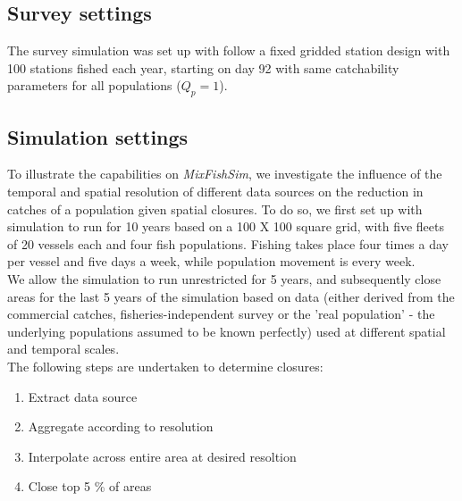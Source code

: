 \documentclass[review]{elsarticle}
\begin{document}
\subsection{Survey settings}

The survey simulation was set up with follow a fixed gridded station design
with 100 stations fished each year, starting on day 92  with same catchability parameters for
all populations ($Q_{p} = 1$). 

\subsection{Simulation settings}

To illustrate the capabilities on \emph{MixFishSim}, we investigate the
influence of the temporal and spatial resolution of different data sources on
the reduction in catches of a population given spatial closures. To do so, we
first set up with simulation to run for 10 years based on a 100 X 100 square
grid, with five fleets of 20 vessels each and four fish populations. Fishing
takes place four times a day per vessel and five days a week, while population
movement is every week. \\

We allow the simulation to run unrestricted for 5 years, and
subsequently close areas for the last 5 years of the simulation based on data
(either derived from the commercial catches, fisheries-independent survey or
the 'real population' - the underlying populations assumed to be known
perfectly) used at different spatial and temporal scales. \\

The following steps are undertaken to determine
closures:

\begin{enumerate}
	\item Extract data source
	\item Aggregate according to resolution
	\item Interpolate across entire area at desired resoltion
	\item Close top 5 \% of areas
\end{enumerate}
\end{document}
